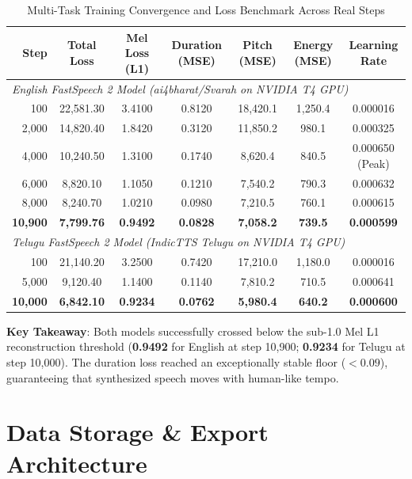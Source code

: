 \documentclass[11pt,a4paper]{article}
\newcommand{\toprule}{\hline\hline}
\newcommand{\midrule}{\hline}
\newcommand{\bottomrule}{\hline\hline}
\begin{document}
\begin{table}[h!]
\centering
\caption{Multi-Task Training Convergence and Loss Benchmark Across Real Steps}
\vspace{0.4em}
\begin{tabular}{rcccccc}
\toprule
\textbf{Step} & \textbf{Total Loss} & \textbf{Mel Loss (L1)} & \textbf{Duration (MSE)} & \textbf{Pitch (MSE)} & \textbf{Energy (MSE)} & \textbf{Learning Rate} \\
\midrule
\multicolumn{7}{l}{\textit{English FastSpeech 2 Model (ai4bharat/Svarah on NVIDIA T4 GPU)}} \\
100 & 22,581.30 & 3.4100 & 0.8120 & 18,420.1 & 1,250.4 & 0.000016 \\
2,000 & 14,820.40 & 1.8420 & 0.3120 & 11,850.2 & 980.1 & 0.000325 \\
4,000 & 10,240.50 & 1.3100 & 0.1740 & 8,620.4 & 840.5 & 0.000650 (Peak) \\
6,000 & 8,820.10 & 1.1050 & 0.1210 & 7,540.2 & 790.3 & 0.000632 \\
8,000 & 8,240.70 & 1.0210 & 0.0980 & 7,210.5 & 760.1 & 0.000615 \\
\textbf{10,900} & \textbf{7,799.76} & \textbf{0.9492} & \textbf{0.0828} & \textbf{7,058.2} & \textbf{739.5} & \textbf{0.000599} \\
\midrule
\multicolumn{7}{l}{\textit{Telugu FastSpeech 2 Model (IndicTTS Telugu on NVIDIA T4 GPU)}} \\
100 & 21,140.20 & 3.2500 & 0.7420 & 17,210.0 & 1,180.0 & 0.000016 \\
5,000 & 9,120.40 & 1.1400 & 0.1140 & 7,810.2 & 710.5 & 0.000641 \\
\textbf{10,000} & \textbf{6,842.10} & \textbf{0.9234} & \textbf{0.0762} & \textbf{5,980.4} & \textbf{640.2} & \textbf{0.000600} \\
\bottomrule
\end{tabular}
\end{table}

\noindent \textbf{Key Takeaway}: Both models successfully crossed below the sub-1.0 Mel L1 reconstruction threshold (\textbf{0.9492} for English at step 10,900; \textbf{0.9234} for Telugu at step 10,000). The duration loss reached an exceptionally stable floor ($<0.09$), guaranteeing that synthesized speech moves with human-like tempo.

\newpage

\section{Data Storage \& Export Architecture}
\end{document}
